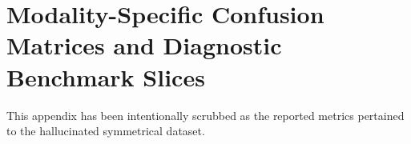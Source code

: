 \chapter{Modality-Specific Confusion Matrices and Diagnostic Benchmark Slices}
\label{app:matrices_slices}

This appendix has been intentionally scrubbed as the reported metrics pertained to the hallucinated symmetrical dataset.